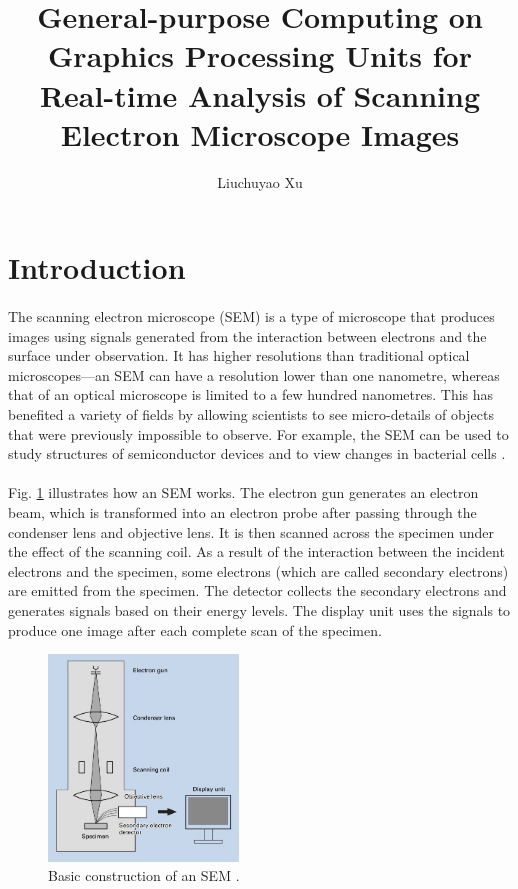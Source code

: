 \documentclass[12pt, twocolumn]{report}
\author{Liuchuyao Xu}
\title{General-purpose Computing on Graphics Processing Units for Real-time Analysis of Scanning Electron Microscope Images}
\begin{document}
\maketitle

\begin{abstract}
\end{abstract}

\section{Introduction}
\paragraph{}
The scanning electron microscope (SEM) is a type of microscope that produces images using signals generated from the interaction between electrons and the surface under observation. It has higher resolutions than traditional optical microscopes---an SEM can have a resolution lower than one nanometre, whereas that of an optical microscope is limited to a few hundred nanometres. This has benefited a variety of fields by allowing scientists to see micro-details of objects that were previously impossible to observe. For example, the SEM can be used to study structures of semiconductor devices \cite{SEM for semiconductors} and to view changes in bacterial cells \cite{SEM for baterial cells}.

\paragraph{}
Fig. \ref{SEM basic construction} illustrates how an SEM works. The electron gun generates an electron beam, which is transformed into an electron probe after passing through the condenser lens and objective lens. It is then scanned across the specimen under the effect of the scanning coil. As a result of the interaction between the incident electrons and the specimen, some electrons (which are called secondary electrons) are emitted from the specimen. The detector collects the secondary electrons and generates signals based on their energy levels. The display unit uses the signals to produce one image after each complete scan of the specimen.

\begin{figure}[htbp]
    \centering
    \includegraphics[width=0.45\textwidth]{Figures/SEM basic construction.jpg}
    \caption{Basic construction of an SEM \cite{SEM A to Z}.}
    \label{SEM basic construction}
\end{figure}
\end{document}
